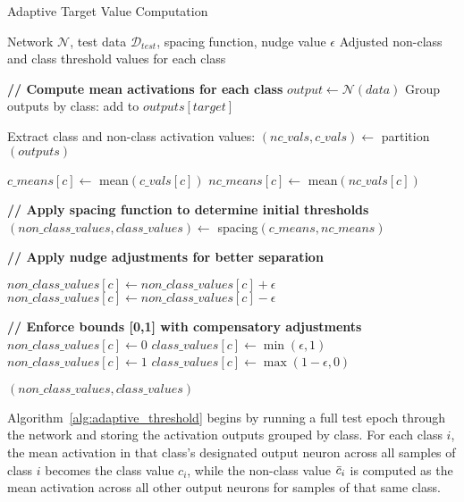 \documentclass[12pt,fleqn,a4paper]{article}
\begin{document}
\begin{algorithm}
\caption{Adaptive Target Value Computation}
\label{alg:adaptive_threshold}
\begin{algorithmic}[1]
\REQUIRE Network $\mathcal{N}$, test data $\mathcal{D}_{test}$, spacing function, nudge value $\epsilon$
\ENSURE Adjusted non-class and class threshold values for each class

\STATE \textbf{// Compute mean activations for each class}
    \STATE $output \leftarrow \mathcal{N}(data)$
    \STATE Group outputs by class: add to $outputs[target]$
\ENDFOR

\STATE Extract class and non-class activation values: $(nc\_vals, c\_vals) \leftarrow$ partition$(outputs)$

    \STATE $c\_means[c] \leftarrow$ mean$(c\_vals[c])$
    \STATE $nc\_means[c] \leftarrow$ mean$(nc\_vals[c])$
\ENDFOR

\STATE \textbf{// Apply spacing function to determine initial thresholds}
\STATE $(non\_class\_values, class\_values) \leftarrow$ spacing$(c\_means, nc\_means)$

\STATE \textbf{// Apply nudge adjustments for better separation}

        \STATE $non\_class\_values[c] \leftarrow non\_class\_values[c] + \epsilon$
    \ELSE
        \STATE $non\_class\_values[c] \leftarrow non\_class\_values[c] - \epsilon$
    \ENDIF
    
    \STATE \textbf{// Enforce bounds [0,1] with compensatory adjustments}
        \STATE $non\_class\_values[c] \leftarrow 0$
        \STATE $class\_values[c] \leftarrow \min(\epsilon, 1)$
        \STATE $non\_class\_values[c] \leftarrow 1$
        \STATE $class\_values[c] \leftarrow \max(1 - \epsilon, 0)$
    \ENDIF
\ENDFOR

\RETURN $(non\_class\_values, class\_values)$
\end{algorithmic}
\end{algorithm}

Algorithm~\ref{alg:adaptive_threshold} begins by running a full test epoch through the network and storing the activation outputs grouped by class. For each class $i$, the mean activation in that class's designated output neuron across all samples of class $i$ becomes the class value $c_i$, while the non-class value $\Bar{c}_i$ is computed as the mean activation across all other output neurons for samples of that same class.
\end{document}
